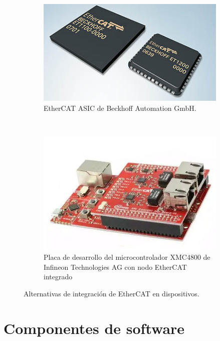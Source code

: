 \begin{figure}[H]
  \centering
  \begin{subfigure}[b]{0.4\textwidth}
    \includegraphics[width=\textwidth]{img/cap2/ethercat_asic.png}
    \caption{EtherCAT ASIC de Beckhoff Automation GmbH.}
    \end{subfigure}%
    ~
  \begin{subfigure}[b]{0.4\textwidth}
    \includegraphics[width=\textwidth]{img/cap2/xmc4800}
    \caption{Placa de desarrollo del microcontrolador XMC4800 de Infineon Technologies AG con nodo EtherCAT integrado}
    \end{subfigure}
  \caption{Alternativas de integración de EtherCAT en dispositivos.}
  \label{cap2_ethercat}
\end{figure}

\section{Componentes de software}

